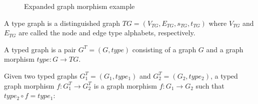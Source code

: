 \begin{example}
\begin{figure}[!ht]
  \centering
  \caption{Expanded graph morphism example}\label{fig:gts:expanded-graph-morphism}
\end{figure}
\end{example}

\begin{definition} A type graph is a distinguished graph $TG = \left(V_{TG},E_{TG},s_{TG},t_{TG}\right)$ where $V_{TG}$ and $E_{TG}$ are called the node and edge type alphabets, respectively.

  A typed graph is a pair $G^T = \left(G, type\right)$ consisting of a graph $G$ and a graph morphism $type : G \rightarrow TG$.

  Given two typed graphs $G^T_1 = \left(G_1,type_1\right)$ and $G^T_2 =\left(G_2,type_2\right)$, a typed graph morphism $f : G^T_1 \rightarrow G^T_2$ is a graph morphism $f : G_1 \rightarrow G_2$ such that $type_2 \circ f = type_1$:

\end{definition}

